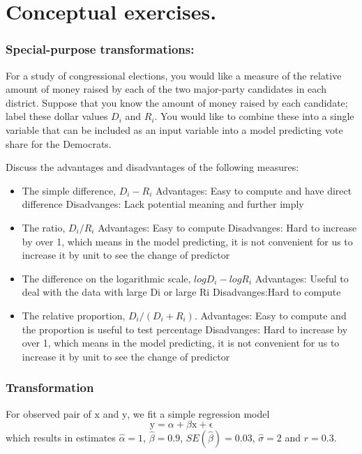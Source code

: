 \documentclass[]{article}
\providecommand{\tightlist}{%
  \setlength{\itemsep}{0pt}\setlength{\parskip}{0pt}}
\begin{document}
\section{Conceptual exercises.}\label{conceptual-exercises.}

\subsubsection{Special-purpose
transformations:}\label{special-purpose-transformations}

For a study of congressional elections, you would like a measure of the
relative amount of money raised by each of the two major-party
candidates in each district. Suppose that you know the amount of money
raised by each candidate; label these dollar values \(D_i\) and \(R_i\).
You would like to combine these into a single variable that can be
included as an input variable into a model predicting vote share for the
Democrats.

Discuss the advantages and disadvantages of the following measures:

\begin{itemize}
\tightlist
\item
  The simple difference, \(D_i-R_i\) Advantages: Easy to compute and
  have direct difference Disadvanges: Lack potential meaning and further
  imply
\item
  The ratio, \(D_i/R_i\) Advantages: Easy to compute Disadvanges: Hard
  to increase by over 1, which means in the model predicting, it is not
  convenient for us to increase it by unit to see the change of
  predictor
\item
  The difference on the logarithmic scale, \(log D_i-log R_i\)
  Advantages: Useful to deal with the data with large Di or large Ri
  Disadvanges:Hard to compute
\item
  The relative proportion, \(D_i/(D_i+R_i)\). Advantages: Easy to
  compute and the proportion is useful to test percentage Disadvanges:
  Hard to increase by over 1, which means in the model predicting, it is
  not convenient for us to increase it by unit to see the change of
  predictor
\end{itemize}

\subsubsection{Transformation}\label{transformation}

For observed pair of \(\mathrm{x}\) and \(\mathrm{y}\), we fit a simple
regression model
\[\mathrm{y}=\alpha + \beta \mathrm{x} + \mathrm{\epsilon}\] which
results in estimates \(\hat{\alpha}=1\), \(\hat{\beta}=0.9\),
\(SE(\hat{\beta})=0.03\), \(\hat{\sigma}=2\) and \(r=0.3\).
\end{document}
